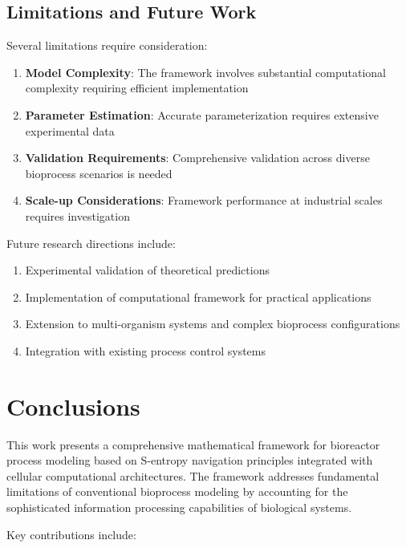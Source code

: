 \documentclass[12pt,a4paper]{article}
\begin{document}
\subsection{Limitations and Future Work}

Several limitations require consideration:
\begin{enumerate}
\item \textbf{Model Complexity}: The framework involves substantial computational complexity requiring efficient implementation
\item \textbf{Parameter Estimation}: Accurate parameterization requires extensive experimental data
\item \textbf{Validation Requirements}: Comprehensive validation across diverse bioprocess scenarios is needed
\item \textbf{Scale-up Considerations}: Framework performance at industrial scales requires investigation
\end{enumerate}

Future research directions include:
\begin{enumerate}
\item Experimental validation of theoretical predictions
\item Implementation of computational framework for practical applications
\item Extension to multi-organism systems and complex bioprocess configurations
\item Integration with existing process control systems
\end{enumerate}

\section{Conclusions}

This work presents a comprehensive mathematical framework for bioreactor process modeling based on S-entropy navigation principles integrated with cellular computational architectures. The framework addresses fundamental limitations of conventional bioprocess modeling by accounting for the sophisticated information processing capabilities of biological systems.

Key contributions include:
\end{document}
